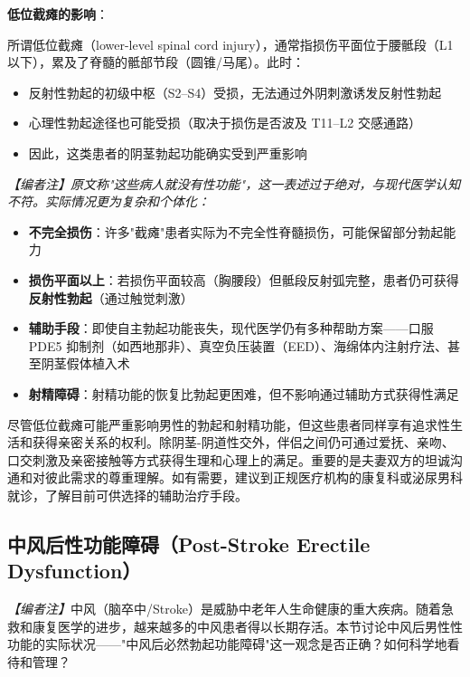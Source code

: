 \documentclass[12pt,a4paper,twoside]{ctexbook}
\begin{document}
\vspace{0.5em}
\noindent\textbf{低位截瘫的影响}：

所谓低位截瘫（lower-level spinal cord injury），通常指损伤平面位于腰骶段（L1以下），累及了脊髓的骶部节段（圆锥/马尾）。此时：
\begin{itemize}
	\item 反射性勃起的初级中枢（S2--S4）受损，无法通过外阴刺激诱发反射性勃起
	\item 心理性勃起途径也可能受损（取决于损伤是否波及 T11--L2 交感通路）
	\item 因此，这类患者的阴茎勃起功能确实受到严重影响
\end{itemize}

\noindent\textit{【编者注】原文称"这些病人就没有性功能"，这一表述过于绝对，与现代医学认知不符。实际情况更为复杂和个体化：}

\begin{itemize}
	\item \textbf{不完全损伤}：许多"截瘫"患者实际为不完全性脊髓损伤，可能保留部分勃起能力
	\item \textbf{损伤平面以上}：若损伤平面较高（胸腰段）但骶段反射弧完整，患者仍可获得\textbf{反射性勃起}（通过触觉刺激）
	\item \textbf{辅助手段}：即使自主勃起功能丧失，现代医学仍有多种帮助方案——口服 PDE5 抑制剂（如西地那非）、真空负压装置（EED）、海绵体内注射疗法、甚至阴茎假体植入术
	\item \textbf{射精障碍}：射精功能的恢复比勃起更困难，但不影响通过辅助方式获得性满足
\end{itemize}

\begin{tcolorbox}[colback=pink!5!white,colframe=red!50!black,title=贴心小叮咛]
尽管低位截瘫可能严重影响男性的勃起和射精功能，但这些患者同样享有追求性生活和获得亲密关系的权利。除阴茎-阴道性交外，伴侣之间仍可通过爱抚、亲吻、口交刺激及亲密接触等方式获得生理和心理上的满足。重要的是夫妻双方的坦诚沟通和对彼此需求的尊重理解。如有需要，建议到正规医疗机构的康复科或泌尿男科就诊，了解目前可供选择的辅助治疗手段。
\end{tcolorbox}

\subsection{中风后性功能障碍（Post-Stroke Erectile Dysfunction）}

\noindent\textit{【编者注】}中风（脑卒中/Stroke）是威胁中老年人生命健康的重大疾病。随着急救和康复医学的进步，越来越多的中风患者得以长期存活。本节讨论中风后男性性功能的实际状况——"中风后必然勃起功能障碍"这一观念是否正确？如何科学地看待和管理？
\end{document}
